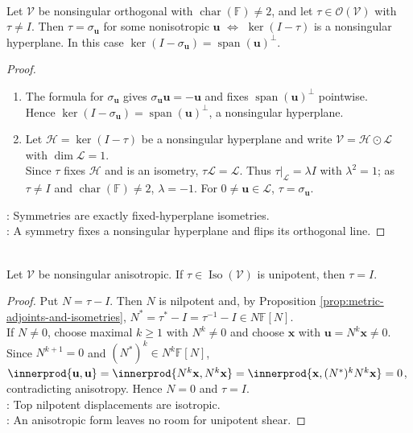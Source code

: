 \begin{proposition} \label{prop:symmetries-fixed-hyperplanes} \\
Let $\mathcal{V}$ be nonsingular orthogonal with $\operatorname{char}(\mathbb{F})\neq2$, and let $\tau\in\mathcal{O}(\mathcal{V})$ with $\tau\neq I$. Then $\tau=\sigma_{\mathbf{u}}$ for some nonisotropic $\mathbf{u}$ $\iff$ $\ker(I-\tau)$ is a nonsingular hyperplane.
In this case $\ker(I-\sigma_{\mathbf{u}})=\operatorname{span}(\mathbf{u})^{\perp}$.
\begin{proof}
\begin{enumerate}[label=\roman*.]
\setlength{\itemsep}{0pt}
\item[$(\Rightarrow)$] The formula for $\sigma_{\mathbf{u}}$ gives $\sigma_{\mathbf{u}}\mathbf{u}=-\mathbf{u}$ and fixes $\operatorname{span}(\mathbf{u})^{\perp}$ pointwise.\\
Hence $\ker(I-\sigma_{\mathbf{u}})=\operatorname{span}(\mathbf{u})^{\perp}$, a nonsingular hyperplane.
\item[$(\Leftarrow)$] Let $\mathcal{H}=\ker(I-\tau)$ be a nonsingular hyperplane and write $\mathcal{V}=\mathcal{H}\odot\mathcal{L}$ with $\dim\mathcal{L}=1$.\\
Since $\tau$ fixes $\mathcal{H}$ and is an isometry, $\tau\mathcal{L}=\mathcal{L}$. Thus $\tau|_{\mathcal{L}}=\lambda I$ with $\lambda^2=1$; as $\tau\neq I$ and $\operatorname{char}(\mathbb{F})\neq2$, $\lambda=-1$. For $0\neq\mathbf{u}\in\mathcal{L}$, $\tau=\sigma_{\mathbf{u}}$.
\end{enumerate}
: Symmetries are exactly fixed-hyperplane isometries.\\
: A symmetry fixes a nonsingular hyperplane and flips its orthogonal line.
\end{proof}
\end{proposition}

\begin{proposition} \label{prop:anisotropic-space-has-no-nontrivial-unipotent-isometries} \\
Let $\mathcal{V}$ be nonsingular anisotropic. If $\tau\in\operatorname{Iso}(\mathcal{V})$ is unipotent, then $\tau=I$.
\begin{proof}
Put $N=\tau-I$. Then $N$ is nilpotent and, by Proposition \ref{prop:metric-adjoints-and-isometries}, $N^*=\tau^*-I=\tau^{-1}-I\in N\mathbb{F}[N]$.\\
If $N\neq0$, choose maximal $k\geq1$ with $N^k\neq0$ and choose $\mathbf{x}$ with $\mathbf{u}=N^k\mathbf{x}\neq0$.\\
Since $N^{k+1}=0$ and $(N^*)^k\in N^k\mathbb{F}[N]$, $\innerprod{\mathbf{u},\mathbf{u}} =\innerprod{N^k\mathbf{x},N^k\mathbf{x}} =\innerprod{\mathbf{x},(N^*)^kN^k\mathbf{x}}=0$, contradicting anisotropy. Hence $N=0$ and $\tau=I$.\\
: Top nilpotent displacements are isotropic.\\
: An anisotropic form leaves no room for unipotent shear.
\end{proof}
\end{proposition}


